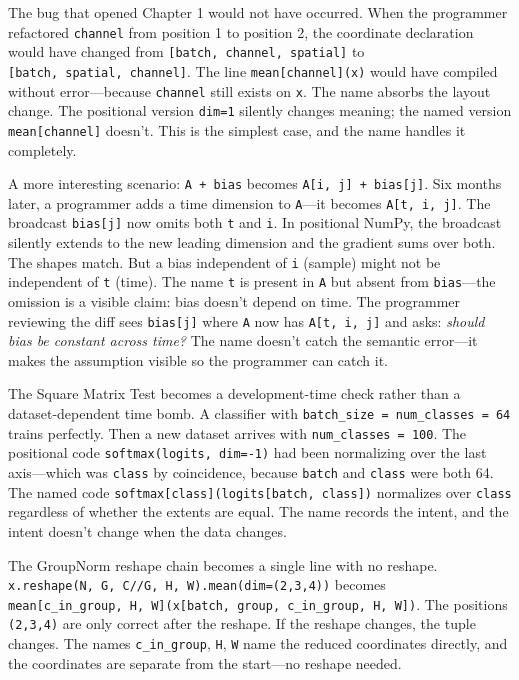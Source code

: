 \documentclass[11pt,titlepage]{article}
\begin{document}
The bug that opened Chapter 1 would not have occurred. When the
programmer refactored \texttt{channel} from position 1 to position 2,
the coordinate declaration would have changed from
\texttt{{[}batch,\ channel,\ spatial{]}} to
\texttt{{[}batch,\ spatial,\ channel{]}}. The line
\texttt{mean{[}channel{]}(x)} would have compiled without
error---because \texttt{channel} still exists on \texttt{x}. The name
absorbs the layout change. The positional version \texttt{dim=1}
silently changes meaning; the named version \texttt{mean{[}channel{]}}
doesn't. This is the simplest case, and the name handles it completely.

A more interesting scenario: \texttt{A\ +\ bias} becomes
\texttt{A{[}i,\ j{]}\ +\ bias{[}j{]}}. Six months later, a programmer
adds a time dimension to \texttt{A}---it becomes
\texttt{A{[}t,\ i,\ j{]}}. The broadcast \texttt{bias{[}j{]}} now omits
both \texttt{t} and \texttt{i}. In positional NumPy, the broadcast
silently extends to the new leading dimension and the gradient sums over
both. The shapes match. But a bias independent of \texttt{i} (sample)
might not be independent of \texttt{t} (time). The name \texttt{t} is
present in \texttt{A} but absent from \texttt{bias}---the omission is a
visible claim: bias doesn't depend on time. The programmer reviewing the
diff sees \texttt{bias{[}j{]}} where \texttt{A} now has
\texttt{A{[}t,\ i,\ j{]}} and asks: \emph{should bias be constant across
time?} The name doesn't catch the semantic error---it makes the
assumption visible so the programmer can catch it.

The Square Matrix Test becomes a development-time check rather than a
dataset-dependent time bomb. A classifier with
\texttt{batch\_size\ =\ num\_classes\ =\ 64} trains perfectly. Then a
new dataset arrives with \texttt{num\_classes\ =\ 100}. The positional
code \texttt{softmax(logits,\ dim=-1)} had been normalizing over the
last axis---which was \texttt{class} by coincidence, because
\texttt{batch} and \texttt{class} were both 64. The named code
\texttt{softmax{[}class{]}(logits{[}batch,\ class{]})} normalizes over
\texttt{class} regardless of whether the extents are equal. The name
records the intent, and the intent doesn't change when the data changes.

The GroupNorm reshape chain becomes a single line with no reshape.
\texttt{x.reshape(N,\ G,\ C//G,\ H,\ W).mean(dim=(2,3,4))} becomes
\texttt{mean{[}c\_in\_group,\ H,\ W{]}(x{[}batch,\ group,\ c\_in\_group,\ H,\ W{]})}.
The positions \texttt{(2,3,4)} are only correct after the reshape. If
the reshape changes, the tuple changes. The names \texttt{c\_in\_group},
\texttt{H}, \texttt{W} name the reduced coordinates directly, and the
coordinates are separate from the start---no reshape needed.
\end{document}

